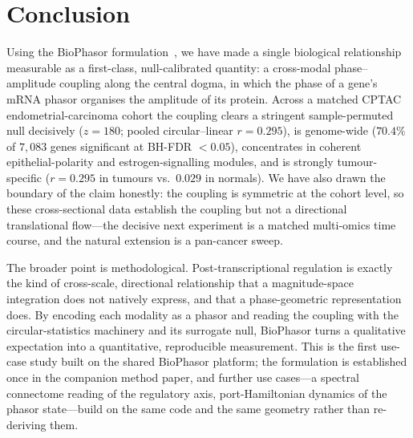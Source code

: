 \documentclass[preprint,12pt,amsmath,amssymb,superscriptaddress,floatfix]{revtex4-2}
\begin{document}
\section{Conclusion}

Using the BioPhasor formulation~\cite{biophasor_platform}, we have made a single
biological relationship measurable as a first-class, null-calibrated quantity: a
cross-modal phase--amplitude coupling along the central dogma, in which the phase
of a gene's mRNA phasor organises the amplitude of its protein. Across a matched
CPTAC endometrial-carcinoma cohort the coupling clears a stringent
sample-permuted null decisively ($z=180$; pooled circular--linear $r=0.295$), is
genome-wide ($70.4\%$ of $7{,}083$ genes significant at BH-FDR $<0.05$),
concentrates in coherent epithelial-polarity and estrogen-signalling modules, and
is strongly tumour-specific ($r=0.295$ in tumours vs.\ $0.029$ in normals). We
have also drawn the boundary of the claim honestly: the coupling is symmetric at
the cohort level, so these cross-sectional data establish the coupling but not a
directional translational flow---the decisive next experiment is a matched
multi-omics time course, and the natural extension is a pan-cancer sweep.

The broader point is methodological. Post-transcriptional regulation is exactly
the kind of cross-scale, directional relationship that a magnitude-space
integration does not natively express, and that a phase-geometric representation
does. By encoding each modality as a phasor and reading the coupling with the
circular-statistics machinery and its surrogate null, BioPhasor turns a
qualitative expectation into a quantitative, reproducible measurement. This is
the first use-case study built on the shared BioPhasor platform; the formulation
is established once in the companion method paper, and further use cases---a
spectral connectome reading of the regulatory axis, port-Hamiltonian dynamics of
the phasor state---build on the same code and the same geometry rather than
re-deriving them.



\end{document}
